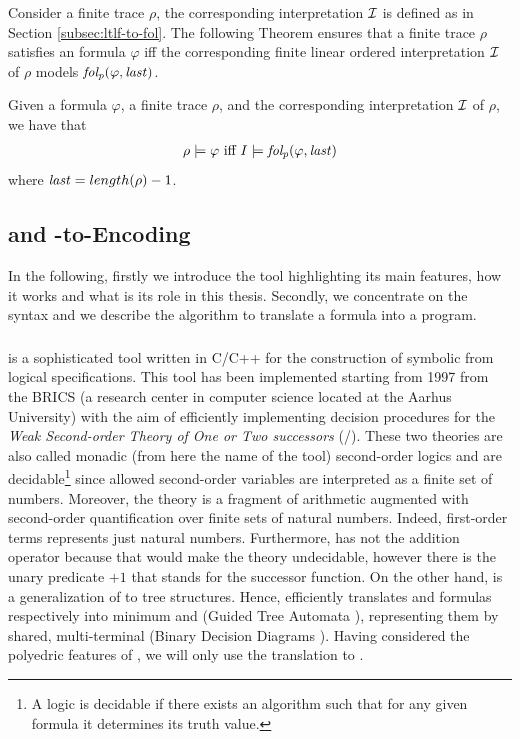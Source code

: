 Consider a finite trace $\rho$, the corresponding \FOL interpretation $\mathcal{I}$ is defined as in Section \ref{subsec:ltlf-to-fol}.
The following Theorem ensures that a finite trace $\rho$ satisfies an \PLTL formula $\varphi$ iff the corresponding finite linear ordered \FOL interpretation $\mathcal{I}$ of $\rho$ models $\mathit{fol_p}(\varphi, \mathit{last})$.
\begin{theorem}\citep{Kamp1968}
Given a \PLTL formula $\varphi$, a finite trace $\rho$, and the corresponding interpretation $\mathcal{I}$ of $\rho$, we have that
\begin{align*}
\rho \models \varphi \ \text{iff}\  I \models \mathit{fol_p}(\varphi, \mathit{last})
\end{align*}
where $\mathit{last} = length(\rho) -1$.
\end{theorem}
\subsection{\MONA and \FOL-to-\MONA Encoding}\label{subsec:fol-to-mona}
In the following, firstly we introduce the \MONA tool highlighting its main features, how it works and what is its role in this thesis. Secondly, we concentrate on the \MONA syntax and we describe the algorithm to translate a \FOL formula into a \MONA program.
\subsubsection{\MONA}
\MONA \citep{mona1998} is a sophisticated tool written in C/C++ for the construction of symbolic \DFA  from logical specifications. This tool has been implemented starting from 1997 from the BRICS (a research center in computer science located at the Aarhus University) with the aim of efficiently implementing decision procedures for the \emph{Weak Second-order Theory of One or Two successors} (\wsos/\wsts). These two theories are also called monadic (from here the name of the tool) second-order logics and are decidable\footnote{A logic is decidable if there exists an algorithm such that for any given formula it determines its truth value.} since allowed second-order variables are interpreted as a finite set of numbers. Moreover, the \wsos theory is a fragment of arithmetic augmented with second-order quantification over finite sets of natural numbers. Indeed, first-order terms represents just natural numbers. Furthermore, \wsos has not the addition operator because that would make the theory undecidable, however there is the unary predicate $+1$ that stands for the successor function. On the other hand, \wsts is a generalization of \wsos to tree structures.
Hence, \MONA efficiently translates \wsos and \wsts formulas respectively into minimum \DFAs and \GTAs (Guided Tree Automata \citep{biehl1996algorithms}), representing them by shared, multi-terminal \bdds (Binary Decision Diagrams \citep{henriksen1995mona}). Having considered the polyedric features of \MONA, we will only use the translation to \DFAs.

